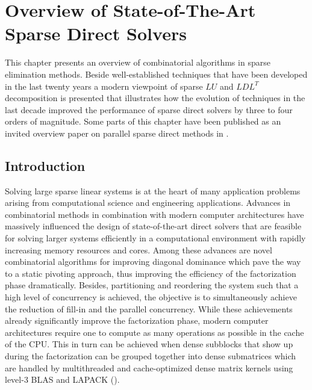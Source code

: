 \chapter{Overview of State-of-The-Art Sparse Direct Solvers}

This chapter presents an overview of combinatorial algorithms in sparse elimination methods.
Beside well-established techniques that have been developed in the last twenty years a modern
viewpoint of sparse $LU$ and $LDL^T$ decomposition is presented that illustrates how the
evolution of techniques in the last decade improved the performance of sparse direct solvers by
three to four orders of magnitude. Some parts of this chapter have been published as an invited
overview paper on parallel sparse direct methods in \cite{Bollhofer2020}.

\section{Introduction}
\label{sec:intro}
Solving large sparse linear systems is at the heart of many application
problems arising from computational science and engineering applications.
Advances in combinatorial
methods in combination with modern computer architectures have massively
influenced the design of state-of-the-art direct solvers
that are feasible for solving  larger systems efficiently
in a computational environment with rapidly increasing memory resources
and cores. Among these advances are 
novel combinatorial algorithms for improving diagonal dominance which
pave the way to a static pivoting approach, thus improving the 
efficiency of the factorization
phase dramatically. Besides, partitioning and reordering the system
such that a high level of concurrency is achieved, the objective is to 
simultaneously achieve the reduction of fill-in and the parallel concurrency.
While these achievements already significantly improve the factorization
phase, modern computer architectures require one to compute as many operations
as possible in the cache of the CPU. This in turn can be achieved when
dense subblocks that show up during the factorization can be grouped
together into dense submatrices which are handled
by multithreaded and cache-optimized 
dense matrix kernels using level-3 BLAS and LAPACK
(\cite{AndBBDDDGHMOS99}).

